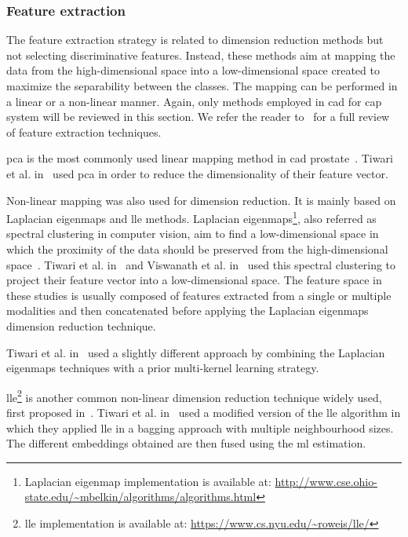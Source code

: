 \subsubsection{Feature extraction}

The feature extraction strategy is related to dimension reduction methods but not selecting discriminative features. Instead, these methods aim at mapping the data from the high-dimensional space into a low-dimensional space created to maximize the separability between the classes. The mapping can be performed in a linear or a non-linear manner. Again, only methods employed in \ac{cad} for \ac{cap} system will be reviewed in this section. We refer the reader to~\cite{Fodor2002} for a full review of feature extraction techniques.

\Ac{pca} is the most commonly used linear mapping method in \ac{cad} prostate~\cite{Jolliffe2002}. Tiwari et al. in~\cite{Tiwari2008,Tiwari2009,Tiwari2012} used \ac{pca} in order to reduce the dimensionality of their feature vector.

Non-linear mapping was also used for dimension reduction. It is mainly based on Laplacian eigenmaps and \acf{lle} methods. Laplacian eigenmaps\footnote{Laplacian eigenmap implementation is available at: \url{http://www.cse.ohio-state.edu/~mbelkin/algorithms/algorithms.html}}, also referred as spectral clustering in computer vision, aim to find a low-dimensional space in which the proximity of the data should be preserved from the high-dimensional space~\cite{Shi2000,Belkin2001}. Tiwari et al. in~\cite{Tiwari2007,Tiwari2009,Tiwari2009a} and Viswanath et al. in~\cite{Viswanath2008} used this spectral clustering to project their feature vector into a low-dimensional space. The feature space in these studies is usually composed of features extracted from a single or multiple modalities and then concatenated before applying the Laplacian eigenmaps dimension reduction technique.

Tiwari et al. in~\cite{Tiwari2009,Tiwari2013} used a slightly different approach by combining the Laplacian eigenmaps techniques with a prior multi-kernel learning strategy.

\Ac{lle}\footnote{\ac{lle} implementation is available at: \url{https://www.cs.nyu.edu/~roweis/lle/}} is another common non-linear dimension reduction technique widely used, first proposed in~\cite{Roweis2000}. Tiwari et al. in~\cite{Tiwari2008} used a modified version of the \ac{lle} algorithm in which they applied \ac{lle} in a bagging approach with multiple neighbourhood sizes. The different embeddings obtained are then fused using the \ac{ml} estimation.

